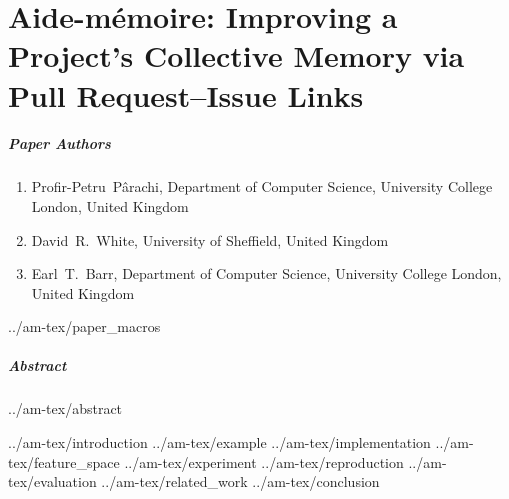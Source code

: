 \chapter{Aide-mémoire: Improving a Project’s Collective Memory via Pull Request--Issue Links}
\label{chapter:am}

\paragraph{Paper Authors}%
\begin{enumerate}
    \item[]  Profir-Petru~P\^arachi, Department of Computer Science, University College London, United Kingdom
    \item[] David~R.~White, University of Sheffield, United Kingdom
    \item[] Earl~T.~Barr, Department of Computer Science, University College London, United Kingdom
\end{enumerate}

{../am-tex/paper_macros}

\paragraph{Abstract}
{../am-tex/abstract}

{../am-tex/introduction}
{../am-tex/example}
{../am-tex/implementation}
{../am-tex/feature_space}
{../am-tex/experiment}
{../am-tex/reproduction}
{../am-tex/evaluation}
{../am-tex/related_work}
{../am-tex/conclusion}
